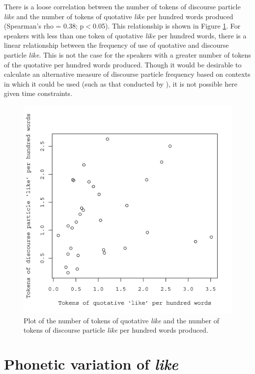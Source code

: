 There is a loose correlation between the number of tokens of discourse particle \textit{like} and the number of tokens of quotative \textit{like} per hundred words produced (Spearman's rho = 0.38; p$<$0.05).  This relationship is shown in Figure \ref{fig:ComparingQDP}.  For speakers with less than one token of quotative \textit{like} per hundred words, there is a linear relationship between the frequency of use of quotative and discourse particle \textit{like}.  This is not the case for the speakers with a greater number of tokens of the quotative per hundred words produced.  Though it would be desirable to calculate an alternative measure of discourse particle frequency based on contexts in which it could be used (such as that conducted by ), it is not possible here given time constraints. 

\begin{figure}
	\centering
		\includegraphics[width=5in]{images/freofuseCompare.jpg}
	\caption{Plot of the number of tokens of quotative \textit{like} and the number of tokens of discourse particle \textit{like} per hundred words produced.}
	\label{fig:ComparingQDP}
\end{figure}



\section{Phonetic variation of \textit{like}}\label{sec:phoneticlike}

